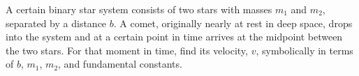 A certain binary star system consists of two stars with
masses $m_1$ and $m_2$, separated by a distance $b$. A
comet, originally nearly at rest in deep space, drops into
the system and at a certain point in time arrives at the
midpoint between the two stars. For that moment in time,
find its velocity, $v$, symbolically in terms of $b$, $m_1$,
$m_2$, and fundamental constants.
\answercheck
